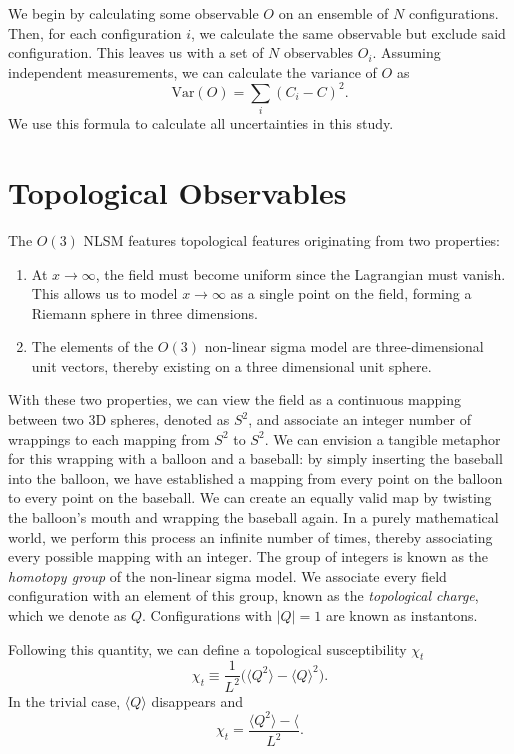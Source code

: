 We begin by calculating some observable $O$ on an ensemble of $N$ configurations. Then, for each configuration $i$, we calculate the same observable but exclude said configuration. This leaves us with a set of $N$ observables $O_i$. Assuming independent measurements, we can calculate the variance of $O$ as
\begin{equation}
    \mathrm{Var}(O) = \sum_{i} \left(C_i - C\right)^2.
\end{equation}
We use this formula to calculate all uncertainties in this study.

\section{Topological Observables}
\label{sec:topological charge}
The $O(3)$ NLSM features topological features originating from two properties: 
\begin{enumerate}
    \item At $x\rightarrow\infty$, the field must become uniform since the Lagrangian must vanish. This allows us to model $x\rightarrow\infty$ as a single point on the field, forming a Riemann sphere in three dimensions.
    \item The elements of the $O(3)$ non-linear sigma model are three-dimensional unit vectors, thereby existing on a three dimensional unit sphere. 
\end{enumerate}

With these two properties, we can view the field as a continuous mapping between two 3D spheres, denoted as $S^2$, and associate an integer number of wrappings to each mapping from $S^2$ to $S^2$. We can envision a tangible metaphor for this wrapping with a balloon and a baseball: by simply inserting the baseball into the balloon, we have established a mapping from every point on the balloon to every point on the baseball. We can create an equally valid map by twisting the balloon's mouth and wrapping the baseball again. In a purely mathematical world, we perform this process an infinite number of times, thereby associating every possible mapping with an integer. The group of integers is known as the \textit{homotopy group} of the non-linear sigma model. We associate every field configuration with an element of this group, known as the \textit{topological charge}, which we denote as $Q$. Configurations with $|Q|=1$ are known as instantons.

Following this quantity, we can define a topological susceptibility $\chi_t$
\begin{equation}
\chi_t \equiv \frac{1}{L^2} \Big( \langle Q^2 \rangle - \langle Q \rangle^2 \Big).
\end{equation}
In the trivial case, $\langle Q \rangle$ disappears and   
\begin{equation}
    \chi_t = \frac{\langle Q^2 \rangle - \langle}{L^2}.
\end{equation}

